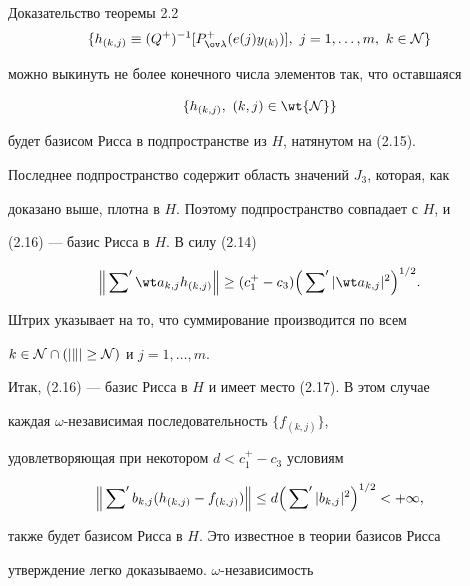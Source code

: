 \begin{pf*}{Доказательство теоремы 2.2}
\begin{equation} 


\{h_{(k,j)}\equiv(Q^+)^{-1}[P^+_{\ov\lambda} 


(e(j)y_{(k)})],\ j=1,\dotsc,m,\ k\in\cal N\} 


\end{equation} 


можно выкинуть не более конечного числа элементов так, что оставшаяся 


\begin{equation} 


\{h_{(k,j)},\ (k,j)\in\wt{\cal N}\} 


\end{equation} 


будет базисом Рисса в подпространстве из $H$, натянутом на (2.15). 


Последнее подпространство содержит область значений $J_3$, которая, как 


доказано выше, плотна в $H$. Поэтому подпространство совпадает с $H$, и 


(2.16) --- базис Рисса в $H$. В силу (2.14) 


\begin{equation} 


\Big\|\sideset{}{'}\sum\wt a_{k,j}h_{(k,j)}\Big\|\ge 


(c^+_1-c_3)\Big(\sideset{}{'}\sum|\wt a_{k,j}|^2\Big)^{1/2}. 


\end{equation} 


Штрих указывает на то, что суммирование производится по всем 


$k\in\cal N\cap(|k|\ge N)$ и $j=1,\dotsc,m$. 


 


Итак, (2.16) --- базис Рисса в $H$ и имеет место (2.17). В этом случае 


каждая $\omega$-независимая последовательность $\{f_{(k,j)}\}$, 


удовлетворяющая при некотором $d<c^+_1-c_3$ условиям 


$$ 


\Big\|\sideset{}{'}\sum b_{k,j}(h_{(k,j)}-f_{(k,j)})\Big\|\le 


d\Big(\sideset{}{'}\sum|b_{k,j}|^2\Big)^{1/2}<+\infty, 


$$ 


также будет базисом Рисса в $H$. Это известное в теории базисов Рисса 


утверждение легко доказываемо.\; $\omega$-независимость 



\end{pf*}
